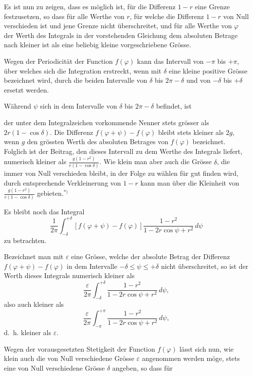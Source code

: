 \documentclass{article}
\begin{document}
Es ist nun zu zeigen, dass es möglich ist, für die Differenz $1 - r$ eine Grenze festzusetzen, so dass für alle Werthe von $r$, für welche die Differenz $1 - r$ von Null verschieden ist und jene Grenze nicht überschreitet, und für alle Werthe von $\varphi$ der Werth des Integrals in der vorstehenden Gleichung dem absoluten Betrage nach kleiner ist als eine beliebig kleine vorgeschriebene Grösse.

Wegen der Periodicität der Function $f(\varphi)$ kann das Intervall von $-\pi$ bis $+\pi$, über welches sich die Integration erstreckt, wenn mit $\delta$ eine kleine positive Grösse bezeichnet wird, durch die beiden Intervalle von $\delta$ bis $2\pi - \delta$ und von $-\delta$ bis $+\delta$ ersetzt werden.

Während $\psi$ sich in dem Intervalle von $\delta$ bis $2\pi - \delta$ befindet, ist

der unter dem Integralzeichen vorkommende Nenner stets grösser als $2r(1 - \cos\delta)$. Die Differenz $f(\varphi + \psi) - f(\varphi)$ bleibt stets kleiner als $2g$, wenn $g$ den grössten Werth des absoluten Betrages von $f(\varphi)$ bezeichnet. Folglich ist der Beitrag, den dieses Intervall zu dem Werthe des Integrals liefert, numerisch kleiner als $\frac{g(1 - r^2)}{r(1 - \cos\delta)}$. Wie klein man aber auch die Grösse $\delta$, die immer von Null verschieden bleibt, in der Folge zu wählen für gut finden wird, durch entsprechende Verkleinerung von $1 - r$ kann man über die Kleinheit von $\frac{g(1 - r^2)}{r(1 - \cos\delta)}$ gebieten.${}^{*)}$

Es bleibt noch das Integral
\[
\frac{1}{2\pi} \int_{-\delta}^{+\delta} [f(\varphi + \psi) - f(\varphi)] \frac{1 - r^2}{1 - 2r \cos\psi + r^2}\,d\psi
\]
zu betrachten.

Bezeichnet man mit $\varepsilon$ eine Grösse, welche der absolute Betrag der Differenz $f(\varphi + \psi) - f(\varphi)$ in dem Intervalle $-\delta \le \psi \le +\delta$ nicht überschreitet, so ist der Werth dieses Integrals numerisch kleiner als
\[
\frac{\varepsilon}{2\pi} \int_{-\delta}^{+\delta} \frac{1 - r^2}{1 - 2r \cos\psi + r^2}\,d\psi,
\]
also auch kleiner als
\[
\frac{\varepsilon}{2\pi} \int_{-\pi}^{+\pi} \frac{1 - r^2}{1 - 2r \cos\psi + r^2}\,d\psi,
\]
d.~h. kleiner als $\varepsilon$.

Wegen der vorausgesetzten Stetigkeit der Function $f(\varphi)$ lässt sich nun, wie klein auch die von Null verschiedene Grösse $\varepsilon$ angenommen werden möge, stets eine von Null verschiedene Grösse $\delta$ angeben, so dass für
\end{document}
